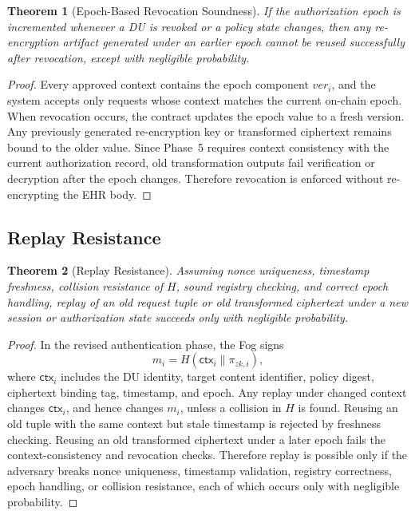 \documentclass[conference]{IEEEtran}
\newtheorem{theorem}{Theorem}
\begin{document}
\begin{theorem}[Epoch-Based Revocation Soundness]
If the authorization epoch is incremented whenever a DU is revoked or a policy state changes, then any re-encryption artifact generated under an earlier epoch cannot be reused successfully after revocation, except with negligible probability.
\end{theorem}

\begin{proof}
Every approved context contains the epoch component $ver_i$, and the system accepts only requests whose context matches the current on-chain epoch. When revocation occurs, the contract updates the epoch value to a fresh version. Any previously generated re-encryption key or transformed ciphertext remains bound to the older value. Since Phase~5 requires context consistency with the current authorization record, old transformation outputs fail verification or decryption after the epoch changes. Therefore revocation is enforced without re-encrypting the EHR body.
\end{proof}

\subsection{Replay Resistance}

\begin{theorem}[Replay Resistance]
Assuming nonce uniqueness, timestamp freshness, collision resistance of $H$, sound registry checking, and correct epoch handling, replay of an old request tuple or old transformed ciphertext under a new session or authorization state succeeds only with negligible probability.
\end{theorem}

\begin{proof}
In the revised authentication phase, the Fog signs
\[
m_i = H(\mathsf{ctx}_i\|\pi_{zk,i}),
\]
where $\mathsf{ctx}_i$ includes the DU identity, target content identifier, policy digest, ciphertext binding tag, timestamp, and epoch. Any replay under changed context changes $\mathsf{ctx}_i$, and hence changes $m_i$, unless a collision in $H$ is found. Reusing an old tuple with the same context but stale timestamp is rejected by freshness checking. Reusing an old transformed ciphertext under a later epoch fails the context-consistency and revocation checks. Therefore replay is possible only if the adversary breaks nonce uniqueness, timestamp validation, registry correctness, epoch handling, or collision resistance, each of which occurs only with negligible probability.
\end{proof}
\end{document}
